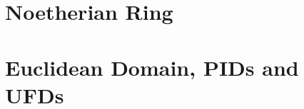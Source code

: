 \documentclass{article}
\begin{document}
\section{Noetherian Ring}

\section{Euclidean Domain, PIDs and UFDs}
\end{document}
